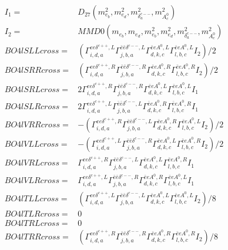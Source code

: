 \documentclass[A4,landscape]{article}
\begin{document}
\begin{align} 
I_1 = & D_{27}(m^2_{e_{{b}}}, m^2_{e_{{d}}}, m^2_{\delta^{c--}_{{a}}}, m^2_{A^0_{{c}}}) \\ 
I_2 = & MMD0(m_{e_{{b}}}, m_{e_{{d}}}, m^2_{e_{{b}}}, m^2_{e_{{d}}}, m^2_{\delta^{c--}_{{a}}}, m^2_{A^0_{{c}}}) \\ 
  BO4lSLLcross= & ( \Gamma^{e e \delta^{c++},L}_{i, d, a} \Gamma^{\bar{e}\bar{e}\delta^{c--} ,L}_{j, b, a} \Gamma^{\bar{e}e A^0 ,L}_{d, k, c} \Gamma^{\bar{e}e A^0 ,L}_{l, b, c} I_2)/2 \\ 
  BO4lSRRcross= & ( \Gamma^{e e \delta^{c++},R}_{i, d, a} \Gamma^{\bar{e}\bar{e}\delta^{c--} ,R}_{j, b, a} \Gamma^{\bar{e}e A^0 ,R}_{d, k, c} \Gamma^{\bar{e}e A^0 ,R}_{l, b, c} I_2)/2 \\ 
  BO4lSRLcross= & 2  \Gamma^{e e \delta^{c++},R}_{i, d, a} \Gamma^{\bar{e}\bar{e}\delta^{c--} ,R}_{j, b, a} \Gamma^{\bar{e}e A^0 ,L}_{d, k, c} \Gamma^{\bar{e}e A^0 ,L}_{l, b, c} I_1 \\ 
  BO4lSLRcross= & 2  \Gamma^{e e \delta^{c++},L}_{i, d, a} \Gamma^{\bar{e}\bar{e}\delta^{c--} ,L}_{j, b, a} \Gamma^{\bar{e}e A^0 ,R}_{d, k, c} \Gamma^{\bar{e}e A^0 ,R}_{l, b, c} I_1 \\ 
  BO4lVRRcross= & -( \Gamma^{e e \delta^{c++},R}_{i, d, a} \Gamma^{\bar{e}\bar{e}\delta^{c--} ,L}_{j, b, a} \Gamma^{\bar{e}e A^0 ,R}_{d, k, c} \Gamma^{\bar{e}e A^0 ,L}_{l, b, c} I_2)/2 \\ 
  BO4lVLLcross= & -( \Gamma^{e e \delta^{c++},L}_{i, d, a} \Gamma^{\bar{e}\bar{e}\delta^{c--} ,R}_{j, b, a} \Gamma^{\bar{e}e A^0 ,L}_{d, k, c} \Gamma^{\bar{e}e A^0 ,R}_{l, b, c} I_2)/2 \\ 
  BO4lVRLcross= &  \Gamma^{e e \delta^{c++},R}_{i, d, a} \Gamma^{\bar{e}\bar{e}\delta^{c--} ,L}_{j, b, a} \Gamma^{\bar{e}e A^0 ,L}_{d, k, c} \Gamma^{\bar{e}e A^0 ,R}_{l, b, c} I_1 \\ 
  BO4lVLRcross= &  \Gamma^{e e \delta^{c++},L}_{i, d, a} \Gamma^{\bar{e}\bar{e}\delta^{c--} ,R}_{j, b, a} \Gamma^{\bar{e}e A^0 ,R}_{d, k, c} \Gamma^{\bar{e}e A^0 ,L}_{l, b, c} I_1 \\ 
  BO4lTLLcross= & ( \Gamma^{e e \delta^{c++},L}_{i, d, a} \Gamma^{\bar{e}\bar{e}\delta^{c--} ,L}_{j, b, a} \Gamma^{\bar{e}e A^0 ,L}_{d, k, c} \Gamma^{\bar{e}e A^0 ,L}_{l, b, c} I_2)/8 \\ 
  BO4lTLRcross= & 0 \\ 
  BO4lTRLcross= & 0 \\ 
  BO4lTRRcross= & ( \Gamma^{e e \delta^{c++},R}_{i, d, a} \Gamma^{\bar{e}\bar{e}\delta^{c--} ,R}_{j, b, a} \Gamma^{\bar{e}e A^0 ,R}_{d, k, c} \Gamma^{\bar{e}e A^0 ,R}_{l, b, c} I_2)/8 \\ 
\end{align} 
\end{document}
